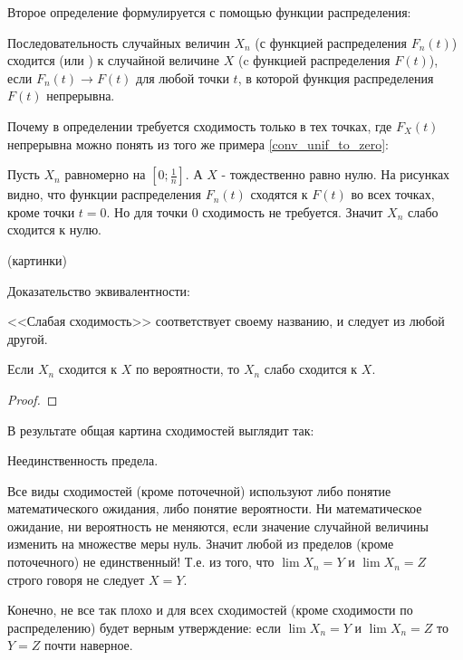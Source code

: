 {\begin{myex}

\end{myex}

Второе определение формулируется с помощью функции распределения:

\begin{mydef} Последовательность случайных величин $X_{n}$ (с функцией распределения $F_{n}(t)$) сходится  (или ) к случайной величине $X$ (c функцией распределения $F(t)$), если $F_{n}(t)\to F(t)$ для любой точки $t$, в которой функция распределения $F(t)$ непрерывна.
\end{mydef}

Почему в определении требуется сходимость только в тех точках, где $F_{X}(t)$ непрерывна можно понять из того же примера \ref{conv_unif_to_zero}: 
\begin{myex}
\label{conv_unif_to_zero2}
Пусть $X_{n}$ равномерно на $[0;\frac{1}{n}]$. А $X$ - тождественно равно нулю. На рисунках видно, что функции распределения $F_{n}(t)$ сходятся к $F(t)$ во всех точках, кроме точки $t=0$. Но для точки $0$ сходимость не требуется. Значит $X_{n}$ слабо сходится к нулю.

(картинки)
\end{myex}


Доказательство эквивалентности:







<<Слабая сходимость>> соответствует своему названию, и следует из любой другой.

\begin{myth} Если $X_{n}$ сходится к $X$ по вероятности, то $X_{n}$ слабо сходится к $X$. 
\end{myth}
\begin{proof}
\end{proof}
В результате общая картина сходимостей выглядит так:




Неединственность предела. \par
Все виды сходимостей (кроме поточечной) используют либо понятие математического ожидания, либо понятие вероятности. Ни математическое ожидание, ни вероятность не меняются, если значение случайной величины изменить на множестве меры нуль. Значит любой из пределов (кроме поточечного) не единственный! Т.е. из того, что $\lim X_{n}=Y$ и $\lim X_{n}=Z$ строго говоря не следует $X=Y$. \par
Конечно, не все так плохо и для всех сходимостей (кроме сходимости по распределению) будет верным утверждение: если $\lim X_{n}=Y$ и $\lim X_{n}=Z$ то $Y=Z$ почти наверное. \par

}
